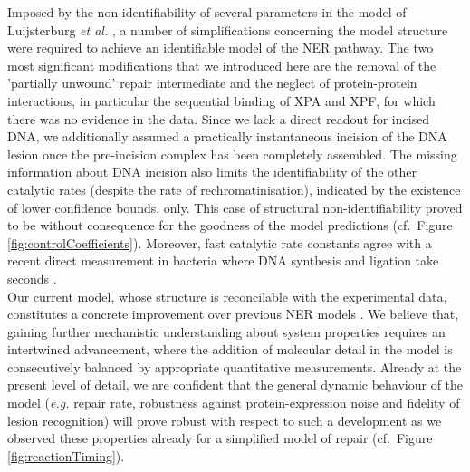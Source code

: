 Imposed by the non-identifiability of several parameters in the model of Luijsterburg \textit{et al.} \cite{Luijsterburg2010}, a number of simplifications concerning the model structure were required to achieve an identifiable model of the NER pathway. The two most significant modifications that we introduced here are the removal of the 'partially unwound' repair intermediate and the neglect of protein-protein interactions, in particular the sequential binding of XPA and XPF, for which there was no evidence in the data. Since we lack a direct readout for incised DNA, we additionally assumed a practically instantaneous incision of the DNA lesion once the pre-incision complex has been completely assembled. The missing information about DNA incision also limits the identifiability of the other catalytic rates (despite the rate of rechromatinisation), indicated by the existence of lower confidence bounds, only. This case of structural non-identifiability proved to be without consequence for the goodness of the model predictions (cf.\ Figure \ref{fig:controlCoefficients}). Moreover, fast catalytic rate constants agree with a recent direct measurement in bacteria where DNA synthesis and ligation take seconds \cite{Uphoff2013}. \\
Our current model, whose structure is reconcilable with the experimental data, constitutes a concrete improvement over previous NER models \cite{Luijsterburg2010,Politi2005,Kesseler2007}. We believe that, gaining further mechanistic understanding about system properties requires an intertwined advancement, where the addition of molecular detail in the model is consecutively balanced by appropriate quantitative measurements. Already at the present level of detail, we are confident that the general dynamic behaviour of the model (\textit{e.g.} repair rate, robustness against protein-expression noise and fidelity of lesion recognition) will prove robust with respect to such a development as we observed these properties already for a simplified model of repair (cf.\ Figure \ref{fig:reactionTiming}).    
       


